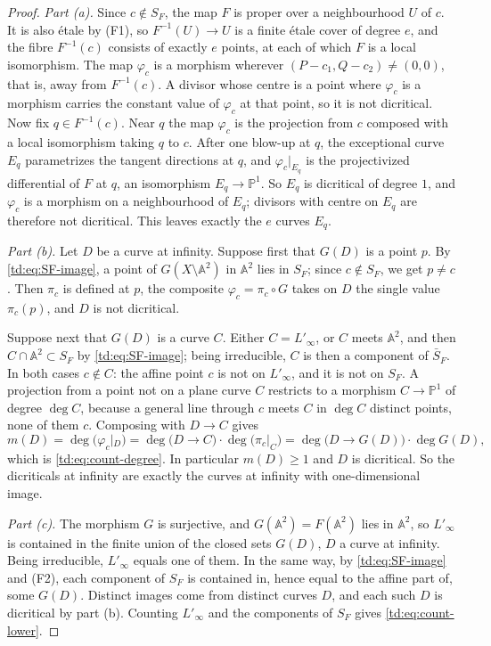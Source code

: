 \documentclass[a4paper,11pt]{article}
\theoremstyle{jsplain}
\theoremstyle{jsdef}
\theoremstyle{jsrem}
\begin{document}
\begin{proof}
\emph{Part (a).} Since $c \notin S_F$, the map $F$ is proper over a neighbourhood $U$ of $c$.
It is also \'{e}tale by (F1), so $F^{-1}(U) \to U$ is a finite \'{e}tale cover of degree $e$, and
the fibre $F^{-1}(c)$ consists of exactly $e$ points, at each of which $F$ is a local
isomorphism. The map $\varphi_c$ is a morphism wherever $(P - c_1, Q - c_2) \neq (0,0)$, that is,
away from $F^{-1}(c)$. A divisor whose centre is a point where $\varphi_c$ is a morphism carries
the constant value of $\varphi_c$ at that point, so it is not dicritical. Now fix
$q \in F^{-1}(c)$. Near $q$ the map $\varphi_c$ is the projection from $c$ composed with a local
isomorphism taking $q$ to $c$. After one blow-up at $q$, the exceptional curve $E_q$
parametrizes the tangent directions at $q$, and $\varphi_c|_{E_q}$ is the projectivized
differential of $F$ at $q$, an isomorphism $E_q \to \mathbb{P}^1$. So $E_q$ is dicritical of
degree $1$, and $\varphi_c$ is a morphism on a neighbourhood of $E_q$; divisors with centre on
$E_q$ are therefore not dicritical. This leaves exactly the $e$ curves $E_q$.

\emph{Part (b).} Let $D$ be a curve at infinity. Suppose first that $G(D)$ is a point $p$. By
\eqref{td:eq:SF-image}, a point of $G(X \setminus \mathbb{A}^2)$ in $\mathbb{A}^2$ lies in
$S_F$; since $c \notin S_F$, we get $p \neq c$. Then $\pi_c$ is defined at $p$, the composite
$\varphi_c = \pi_c \circ G$ takes on $D$ the single value $\pi_c(p)$, and $D$ is not dicritical.

Suppose next that $G(D)$ is a curve $C$. Either $C = L'_\infty$, or $C$ meets $\mathbb{A}^2$, and
then $C \cap \mathbb{A}^2 \subset S_F$ by \eqref{td:eq:SF-image}; being irreducible, $C$ is then a
component of $\bar{S}_F$. In both cases $c \notin C$: the affine point $c$ is not on
$L'_\infty$, and it is not on $S_F$. A projection from a point not on a plane curve $C$ restricts
to a morphism $C \to \mathbb{P}^1$ of degree $\deg C$, because a general line through $c$ meets
$C$ in $\deg C$ distinct points, none of them $c$. Composing with $D \to C$ gives
\[
m(D) = \deg(\varphi_c|_D) = \deg\big(D \to C\big) \cdot \deg\big(\pi_c|_C\big)
= \deg\big(D \to G(D)\big) \cdot \deg G(D),
\]
which is \eqref{td:eq:count-degree}. In particular $m(D) \geq 1$ and $D$ is dicritical. So the
dicriticals at infinity are exactly the curves at infinity with one-dimensional image.

\emph{Part (c).} The morphism $G$ is surjective, and $G(\mathbb{A}^2) = F(\mathbb{A}^2)$ lies in
$\mathbb{A}^2$, so $L'_\infty$ is contained in the finite union of the closed sets $G(D)$, $D$ a
curve at infinity. Being irreducible, $L'_\infty$ equals one of them. In the same way, by
\eqref{td:eq:SF-image} and (F2), each component of $S_F$ is contained in, hence equal to the affine
part of, some $G(D)$. Distinct images come from distinct curves $D$, and each such $D$ is
dicritical by part (b). Counting $L'_\infty$ and the components of $S_F$ gives
\eqref{td:eq:count-lower}.
\end{proof}
\end{document}
